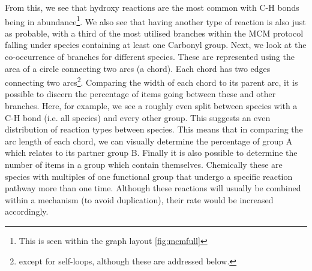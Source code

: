 From this, we see that hydroxy reactions are the most common with C-H bonds being in abundance\footnote{This is seen within the graph layout \autoref{fig:mcmfull}}. We also see that having another type of reaction is also just as probable, with a third of the most utilised branches within the MCM protocol falling under species containing at least one Carbonyl group.
Next, we look at the co-occurrence of branches for different species. These are represented using the area of a circle connecting two arcs (a chord). Each chord has two edges connecting two arcs\footnote{ except for self-loops, although these are addressed below.}. Comparing the width of each chord to its parent arc, it is possible to discern the percentage of items going between these and other branches. Here, for example, we see a roughly even split between species with a C-H bond (i.e. all species) and every other group. This suggests an even distribution of reaction types between species.
This means that in comparing the arc length of each chord, we can visually determine the percentage of group A which relates to its partner group B. Finally it is also possible to determine the number of items in a group which contain themselves. Chemically these are species with multiples of one functional group that undergo a specific reaction pathway more than one time. Although these reactions will usually be combined within a mechanism (to avoid duplication), their rate would be increased accordingly.

